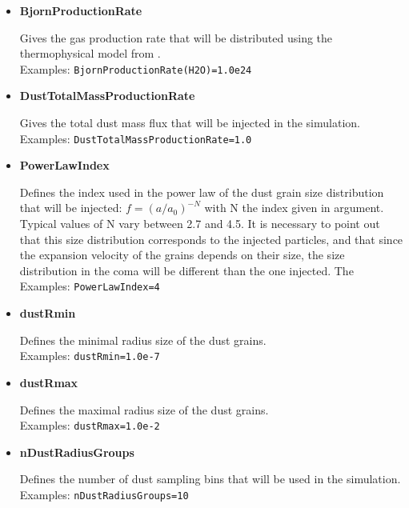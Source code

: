 \begin{itemize}
\item {\bf BjornProductionRate}

Gives the gas production rate that will be distributed using the thermophysical model from \cite{Davidsson-2004-icarus,Davidsson-2005-icarus,Davidsson-2006-icarus}.
\\Examples: {\tt  BjornProductionRate(H2O)=1.0e24}

\item {\bf DustTotalMassProductionRate}

Gives the total dust mass flux that will be injected in the simulation.
\\Examples: {\tt DustTotalMassProductionRate=1.0}

\item {\bf PowerLawIndex}

Defines the index used in the power law of the dust grain size distribution that will be injected: $f=\left(a/a_{0}\right)^{-N}$ with N the index given in argument. Typical values of N vary between 2.7 and 4.5. It is necessary to point out that this size distribution corresponds to the injected particles, and that since the expansion velocity of the grains depends on their size, the size distribution in the coma will be different than the one injected. The 
\\Examples: {\tt PowerLawIndex=4}

\item {\bf dustRmin}

Defines the minimal radius size of the dust grains.
\\Examples: {\tt dustRmin=1.0e-7}

\item {\bf dustRmax}

Defines the maximal radius size of the dust grains.
\\Examples: {\tt dustRmax=1.0e-2}

\item {\bf nDustRadiusGroups}

Defines the number of dust sampling bins that will be used in the simulation.
\\Examples: {\tt nDustRadiusGroups=10}

\end{itemize}